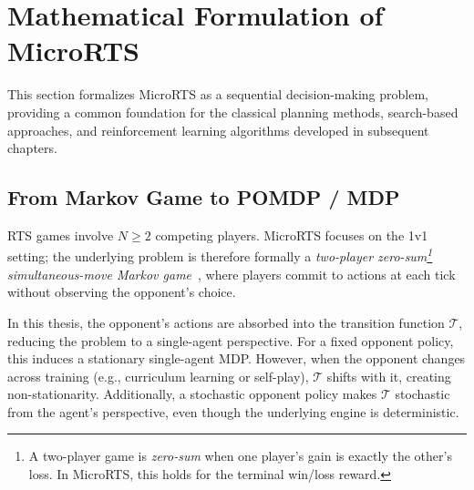 \section{Mathematical Formulation of MicroRTS}
\label{sec:mdp_formulation}

This section formalizes MicroRTS as a sequential decision-making problem, providing a common foundation for the classical planning methods, search-based approaches, and reinforcement learning algorithms developed in subsequent chapters.

\subsection{From Markov Game to POMDP / MDP}
\label{sec:MDP}

RTS games involve $N \geq 2$ competing players. MicroRTS focuses on the 1v1 setting; the underlying problem is therefore formally a \emph{two-player zero-sum\footnote{A two-player game is \emph{zero-sum} when one player's gain is exactly the other's loss. In MicroRTS, this holds for the terminal win/loss reward.} simultaneous-move Markov game}~\cite{littmanMarkovGamesFramework1994}, where players commit to actions at each tick without observing the opponent's choice.

In this thesis, the opponent's actions are absorbed into the transition function $\mathcal{T}$, reducing the problem to a single-agent perspective. For a fixed opponent policy, this induces a stationary single-agent MDP. However, when the opponent changes across training (e.g., curriculum learning or self-play), $\mathcal{T}$ shifts with it, creating non-stationarity. Additionally, a stochastic opponent policy makes $\mathcal{T}$ stochastic from the agent's perspective, even though the underlying engine is deterministic.

\medskip

